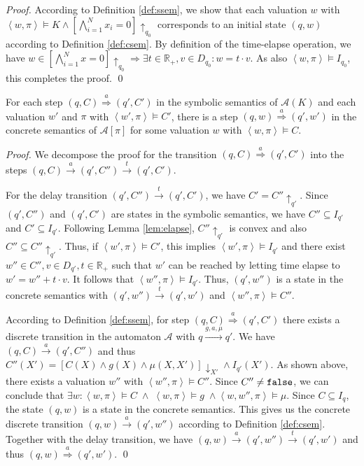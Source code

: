 \documentclass{llncs}
\newcommand{\A}{\ensuremath{\mathcal{A}}}
\newcommand{\Reals}{\ensuremath{\mathbb{R}}}
\newcommand{\false}{{\tt false}}
\newcommand{\trans}[1]{\ensuremath{\overset{#1}{\rightarrow}}}
\newcommand{\Trans}[1]{\ensuremath{\overset{#1}{\Rightarrow}}}
\newcommand{\project}[1]{\ensuremath{\downarrow_{#1}}}
\newcommand{\telapse}{\ensuremath{\uparrow}}
\begin{document}
\begin{proof}
  According to Definition \ref{def:ssem}, we show that each valuation
  $w$ with $\left<w, \pi\right> \models K \wedge [\bigwedge_{i=1}^N
  x_i=0]\telapse_{q_0}$ corresponds to an initial state $(q,w)$
  according to Definition \ref{def:csem}.  By definition of the
  time-elapse operation, we have $w \in [\bigwedge_{i=1}^N x=0]
  \telapse_{q_0} \Rightarrow \exists t \in \Reals_+, v \in D_{q_0}: w
  = t \cdot v$. As also $\left<w, \pi\right> \models I_{q_0}$, this
  completes the proof.  \qed
\end{proof}

\begin{lemma}\label{lem:step_sc}
  For each step $(q,C) \Trans{a} (q',C')$ in the symbolic semantics of
  $\A(K)$ and 
each valuation $w'$ and
  $\pi$ with $\left<w',\pi\right> \models C'$,
 there is a step $(q,w) \Trans{a} (q',w')$ in the
  concrete semantics of $\A[\pi]$ for some valuation
$w$ with $\left<w,\pi\right> \models C$.
\end{lemma}

\begin{proof}
  We decompose the proof for the transition $(q,C) \Trans{a} (q', C')$
  into the steps $(q,C) \trans{a} (q',C'') \trans{t} (q', C')$.

  For the delay transition $(q', C'') \trans{t} (q', C')$, we have $C'
  = C''\telapse_{q'}$. Since $(q',C'')$ and $(q',C')$ are states in
  the symbolic semantics, we have $C'' \subseteq I_{q'}$ and $C'
  \subseteq I_{q'}$. Following Lemma \ref{lem:elapse},
  $C''\telapse_{q'}$ is convex and also $C'' \subseteq
  C''\telapse_{q'}$. Thus, if $\left<w',\pi\right> \models C'$, this
  implies $\left<w',\pi\right> \models I_{q'}$ and there exist $w''
  \in C'', v \in D_{q'}, t \in \Reals_+$ such that $w'$ can be
  reached by letting time elapse to $w' = w'' + t \cdot v$. It follows
  that $\left<w'',\pi\right> \models I_{q'}$. Thus,
  $(q', w'')$ is a state in the concrete semantics with $(q', w'')
  \trans{t} (q', w')$ and $\left<w'', \pi\right> \models C''$.

  According to Definition \ref{def:ssem}, for step $(q,C) \Trans{a}
  (q',C')$ there exists a discrete transition in the automaton
  $\A$ with $q \xrightarrow{g,a,\mu} q'$. We have $(q,C)
  \trans{a} (q',C'')$ and thus $C''(X') = \left[ C(X) \wedge g(X)
    \wedge \mu(X,X')\right] \project{X'} \wedge I_{q'}(X')$. As shown
  above, there exists a valuation $w''$ with $\left<w'', \pi\right>
  \models C''$. Since $C'' \neq \false$, we can conclude that $\exists
  w: \left<w,\pi\right> \models C \; \wedge \; \left<w,\pi\right>
  \models g \; \wedge \left<w, w'',\pi\right> \models
  \mu$. Since $C \subseteq I_{q}$, the state $(q,w)$ is a state in the
  concrete semantics. This gives us the concrete discrete
  transition $(q,w) \trans{a} (q',w'')$ according to Definition
  \ref{def:csem}. Together with the delay transition, we have
  $(q,w)\trans{a}(q',w'')\trans{t}(q',w')$ and thus
  $(q,w)\Trans{a}(q',w')$.
 \qed
\end{proof}
\end{document}

